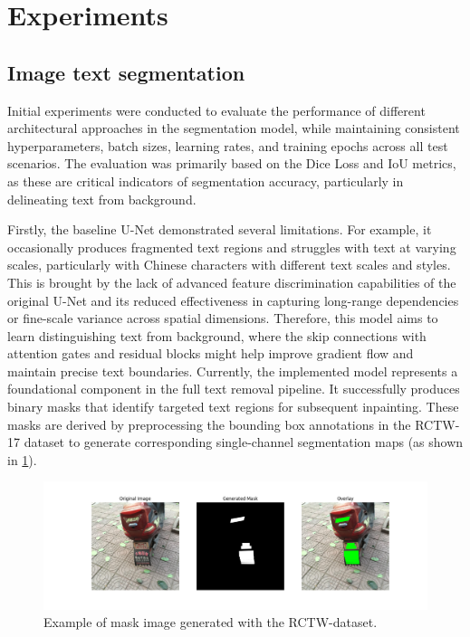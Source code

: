 \documentclass[10pt,twocolumn,letterpaper]{article}
\begin{document}
\section{Experiments}

\subsection{Image text segmentation}
Initial experiments were conducted to evaluate the performance of different architectural approaches in the segmentation model, while maintaining consistent 
hyperparameters, batch sizes, learning rates, and training epochs across all test scenarios. The evaluation was primarily based on the Dice Loss and 
IoU metrics, as these are critical indicators of segmentation accuracy, particularly in delineating text from background.

Firstly, the baseline U-Net demonstrated several limitations. For example, it occasionally produces fragmented text regions and struggles with text at varying scales, 
particularly with Chinese characters with different text scales and styles. This is brought by the lack of advanced feature discrimination capabilities of the original 
U-Net and its reduced effectiveness in capturing long-range dependencies or fine-scale variance across spatial dimensions. Therefore, this model aims to learn 
distinguishing text from background, where the skip connections with attention gates and residual blocks might help improve gradient flow and maintain precise text boundaries. 
Currently, the implemented model represents a foundational component in the full text removal pipeline. It successfully produces binary masks that identify targeted text regions 
for subsequent inpainting. These masks are derived by preprocessing the bounding box annotations in the RCTW-17 dataset to generate corresponding single-channel segmentation maps 
(as shown in \cref{fig:verify}).

\begin{figure}[t]
    \centering
    \includegraphics[width=\linewidth]{figures/milestone/verify_1.png}
    \caption{Example of mask image generated with the RCTW-dataset.}
    \label{fig:verify}
\end{figure}
\end{document}
